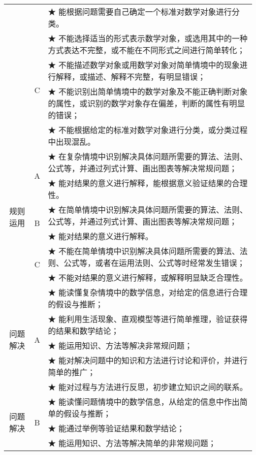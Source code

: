 \begin{itshape}
\begin{longtable}{|c|c|p{12cm}|}
   & &  ★ 能根据问题需要自己确定一个标准对数学对象进行分类。 \\    
\cline{2-3}      

   &   \multirow{4}{*}{C}  &  ★ 不能选择适当的形式表示数学对象，或选用其中的一种方式表达不完整，或不能在不同形式之间进行简单转化；\\  
   & &  ★ 不能描述数学对象或用数学对象对简单情境中的现象进行解释，或描述、解释不完整，有明显错误；\\  
   & &  ★ 不能识别出简单情境中的数学对象及不能正确判断对象的属性，或识别的数学对象存在偏差，判断的属性有明显的错误； \\   
   & &  ★ 不能根据给定的标准对数学对象进行分类，或分类过程中出现混乱。 \\   
\hline
   
   \multirow{6}{*}{规则运用}  & \multirow{2}{*}{A}  & ★   在复杂情境中识别解决具体问题所需要的算法、法则、公式等，并通过列式计算、画出图表等解决常规问题； \\    
   & &  ★ 能对结果的意义进行解释，能根据意义验证结果的合理性。 \\   
\cline{2-3}      

   &   \multirow{2}{*}{B}  &  ★ 在简单情境中识别解决具体问题所需要的算法、法则、公式等，并通过列式计算、画出图表等解决常规问题；\\  
   & &  ★   能对结果的意义进行解释。\\   
\cline{2-3}      

   &   \multirow{2}{*}{C}  &  ★ 不能在简单情境中识别解决具体问题所需要的算法、法则、公式等，或者在运用法则、公式等时经常发生错误；\\  
   & &  ★ 不能对结果的意义进行解释，或解释明显缺乏合理性。\\  
\hline
   
   \multirow{5}{*}{问题解决}  & \multirow{5}{*}{A}  & ★ 能读懂复杂情境中的数学信息，对给定的信息进行合理的假设与推断； \\    
   & &  ★ 能利用生活现象、直观模型等进行简单推理，验证获得的结果和数学结论； \\  
   & &  ★ 能运用知识、方法等解决非常规问题；\\    
   & &  ★ 能对解决问题中的知识和方法进行讨论和评价，并进行简单的推广；\\  
   & &  ★ 能对过程与方法进行反思，初步建立知识之间的联系。\\    
\cline{2-3}      

   \multirow{8}{*}{问题解决} &   \multirow{4}{*}{B}  &  ★ 能读懂问题情境中的数学信息，从给定的信息中作出简单的假设与推断；\\  
   & &  ★   能通过举例等验证结果和数学结论；\\  
   & &  ★ 能运用知识、方法等解决简单的非常规问题； \\   
   

\end{longtable}
\end{itshape}
